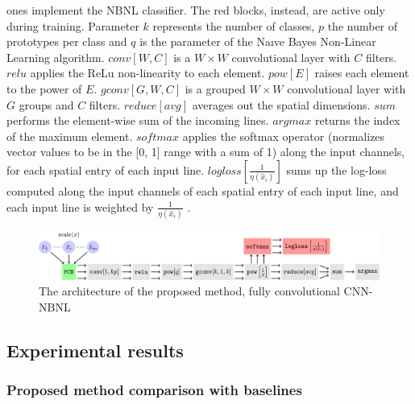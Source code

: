 ones implement the NBNL classifier. The red blocks, instead, are active
only during training. Parameter $k$ represents the number of classes,
$p$ the number of prototypes per class and $q$ is the parameter of
the Naıve Bayes Non-Linear Learning algorithm. $conv[W,C]$ is a
$W \times W$ convolutional layer with $C$ filters. $relu$ applies
the ReLu non-linearity to each element. $pow[E] $ raises each element
to the power of $E$. $gconv[G,W,C]$ is a grouped $W \times W$
convolutional layer with $G$ groups and $C$ filters. $reduce[avg]$
averages out the spatial dimensions. $sum$ performs the element-wise
sum of the incoming lines. $argmax$ returns the index of the maximum
element. $softmax$ applies the softmax operator (normalizes vector
values to be in the {[}0, 1{]} range with a sum of 1) along the input
channels, for each spatial entry of each input line.
$logloss[ \frac{1}{\eta (\hat{x}_i)} ]$ sums up the log-loss computed
along the input channels of each spatial entry of each input line, and
each input line is weighted by $\frac{1}{\eta (\hat{x}_i)}$ .

\begin{figure}[h!]
\centering
\includegraphics[width=0.95\linewidth]{images/CNNNBNL.png}
\caption{The architecture of the proposed method, fully convolutional CNN-NBNL}
\end{figure}

\subsection{Experimental results}\label{header-n699}

\subsubsection{Proposed method comparison with
baselines}\label{header-n700}

